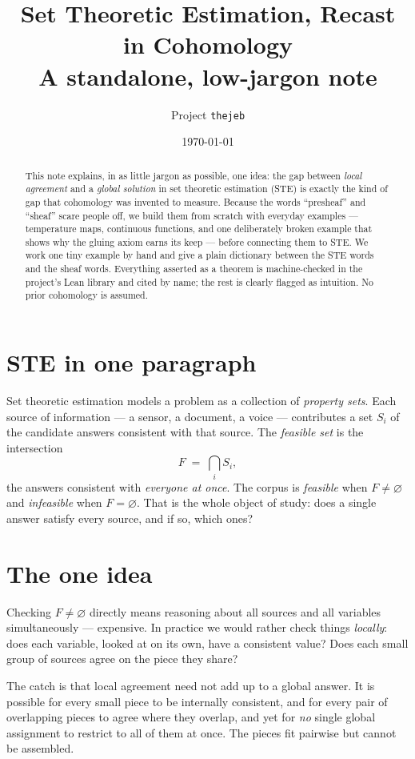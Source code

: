 \documentclass[11pt]{article}
\title{Set Theoretic Estimation, Recast in Cohomology\\
\large A standalone, low-jargon note}
\author{Project \texttt{thejeb}}
\date{\today}
\begin{document}
\maketitle

\begin{abstract}
This note explains, in as little jargon as possible, one idea: the gap
between \emph{local agreement} and a \emph{global solution} in set
theoretic estimation (STE) is exactly the kind of gap that cohomology
was invented to measure.  Because the words ``presheaf'' and ``sheaf''
scare people off, we build them from scratch with everyday examples ---
temperature maps, continuous functions, and one deliberately broken
example that shows why the gluing axiom earns its keep --- before
connecting them to STE.  We work one tiny example by hand and give a
plain dictionary between the STE words and the sheaf words.  Everything
asserted as a theorem is machine-checked in the project's Lean library
and cited by name; the rest is clearly flagged as intuition.  No prior
cohomology is assumed.
\end{abstract}

\section{STE in one paragraph}
Set theoretic estimation \citep{combettes1993} models a problem as a
collection of \emph{property sets}.  Each source of information --- a
sensor, a document, a voice --- contributes a set $S_i$ of the
candidate answers consistent with that source.  The \emph{feasible set}
is the intersection
\[
  F \;=\; \bigcap_i S_i,
\]
the answers consistent with \emph{everyone at once}.  The corpus is
\emph{feasible} when $F \neq \varnothing$ and \emph{infeasible} when
$F = \varnothing$.  That is the whole object of study: does a single
answer satisfy every source, and if so, which ones?

\section{The one idea}
Checking $F \neq \varnothing$ directly means reasoning about all
sources and all variables simultaneously --- expensive.  In practice we
would rather check things \emph{locally}: does each variable, looked at
on its own, have a consistent value?  Does each small group of sources
agree on the piece they share?

The catch is that local agreement need not add up to a global answer.
It is possible for every small piece to be internally consistent, and
for every pair of overlapping pieces to agree where they overlap, and
yet for \emph{no} single global assignment to restrict to all of them
at once.  The pieces fit pairwise but cannot be assembled.
\end{document}
